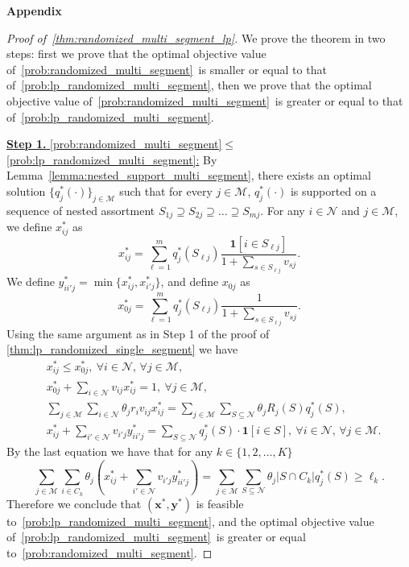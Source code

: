\documentclass[msom,non-blindrev]{informs3} %
\theoremstyle{definition}
\begin{document}
\begin{appendices}{\Large \noindent\textbf{Appendix}}
\begin{proof}[Proof of~\cref{thm:randomized_multi_segment_lp}]
We prove the theorem in two steps: first we prove that the optimal objective value of~\eqref{prob:randomized_multi_segment}~is smaller or equal to that of~\eqref{prob:lp_randomized_multi_segment}, then we prove that the optimal objective value of~\eqref{prob:randomized_multi_segment}~is greater or equal to that of~\eqref{prob:lp_randomized_multi_segment}.

\underline{\textbf{Step 1.} \eqref{prob:randomized_multi_segment}$\leq$\eqref{prob:lp_randomized_multi_segment}:} By Lemma~\ref{lemma:nested_support_multi_segment}, there exists an optimal solution $\{q^*_j(\cdot)\}_{j\in\mathcal{M}}$ such that for every $j\in\mathcal{M}$, $q^*_j(\cdot)$ is supported on a sequence of nested assortment $S_{1j}\supseteq S_{2j}\supseteq \dots \supseteq S_{mj}$. For any $i\in\mathcal{N}$ and $j\in\mathcal{M}$, we define $x^*_{ij}$ as
\begin{equation*}
x^*_{ij}=\sum_{\ell=1}^m q^*_j(S_{\ell j})\dfrac{\bm{1}[i\in S_{\ell j}]}{1+\sum_{s\in S_{\ell j}}v_{sj}}.
\end{equation*}
We define $y^*_{ii'j}=\min\{x^*_{ij},x^*_{i'j}\}$, and define $x_{0j}$ as
\begin{equation*}
x^*_{0j}=\sum_{\ell=1}^m q^*_j(S_{\ell j})\dfrac{1}{1+\sum_{s\in S_{\ell j}}v_{sj}}.
\end{equation*}
Using the same argument as in Step 1 of the proof of \cref{thm:lp_randomized_single_segment} we have
\begin{align*}
&x^*_{ij}\leq x^*_{0j},\ \forall i\in\mathcal{N},\, \forall j\in\mathcal{M},\\
&x^*_{0j}+\sum_{i\in\mathcal{N}}v_{ij}x^*_{ij}=1,\ \forall j\in\mathcal{M},\\
&\sum_{j\in\mathcal{M}}\sum_{i\in\mathcal{N}}\theta_jr_iv_{ij}x^*_{ij}=\sum_{j\in\mathcal{M}}\sum_{S\subseteq\mathcal{N}}\theta_jR_j(S)q^*_j(S),\\
&x^*_{ij}+\sum_{i'\in\mathcal{N}}v_{i'j}y^*_{ii'j}=\sum_{S\subseteq\mathcal{N}}q^*_j(S)\cdot \bm{1}[i\in S],\ \forall i\in\mathcal{N},\, \forall j\in\mathcal{M}.
\end{align*}
By the last equation we have that for any $k\in\{1,2,\dots,K\}$
\begin{equation*}
\sum_{j\in\mathcal{M}}\sum_{i\in C_k}\theta_j\left(x^*_{ij}+\sum_{i'\in\mathcal{N}}v_{i'j}y^*_{ii'j}\right)=\sum_{j\in\mathcal{M}}\sum_{S\subseteq\mathcal{N}}\theta_j|S\cap C_k|q^*_j(S)\geq \ell_k.
\end{equation*}
Therefore we conclude that $(\mathbf{x}^*,\mathbf{y}^*)$ is feasible to~\eqref{prob:lp_randomized_multi_segment}, and the optimal objective value of~\eqref{prob:lp_randomized_multi_segment}~is greater or equal to~\eqref{prob:randomized_multi_segment}.


\end{proof}
\end{appendices}
\end{document}
